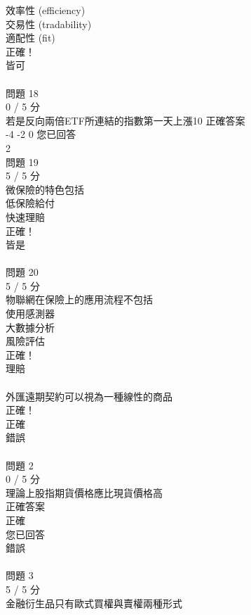 \begin{multicols}{3}
  效率性 (efficiency) \\
  交易性 (tradability) \\
  適配性 (fit) \\
正確！\\
  皆可 \\
 \\
問題 18\\
0 / 5 分\\
若是反向兩倍ETF所連結的指數第一天上漲10%
正確答案\\
  -4%
  -2%
  0%
您已回答\\
  2%
 \\
問題 19\\
5 / 5 分\\
微保險的特色包括\\
  低保險給付 \\
  快速理賠 \\
正確！\\
  皆是 \\
 \\
問題 20\\
5 / 5 分\\
物聯網在保險上的應用流程不包括\\
  使用感測器 \\
  大數據分析 \\
  風險評估 \\
正確！\\
  理賠 \\
  \\
外匯遠期契約可以視為一種線性的商品\\
正確！\\
  正確 \\
  錯誤 \\
 \\
問題 2\\
0 / 5 分\\
理論上股指期貨價格應比現貨價格高\\
正確答案\\
  正確 \\
您已回答\\
  錯誤 \\
 \\
問題 3\\
5 / 5 分\\
金融衍生品只有歐式買權與賣權兩種形式\\

\end{multicols}
